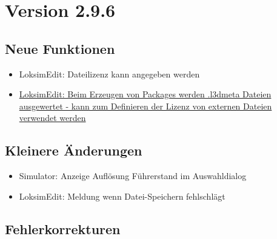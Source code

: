 \section{Version 2.9.6}
\subsection{Neue Funktionen}
\begin{itemize}
    \item LoksimEdit: Dateilizenz kann angegeben werden
    \item \hyperref[sec:editor.allg.packages.l3dmeta]{LoksimEdit: Beim Erzeugen von Packages werden .l3dmeta Dateien ausgewertet - kann zum Definieren der Lizenz von externen Dateien verwendet werden}
\end{itemize}


\subsection{Kleinere Änderungen}
\begin{itemize}
\item Simulator: Anzeige Auflösung Führerstand im Auswahldialog
\item LoksimEdit: Meldung wenn Datei-Speichern fehlschlägt
\end{itemize}

\subsection{Fehlerkorrekturen}
\begin{itemize}
\end{itemize}

